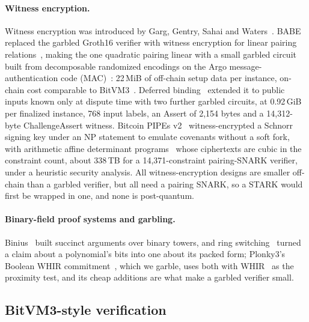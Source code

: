 \documentclass[11pt]{article}
\begin{document}
\paragraph{Witness encryption.} Witness encryption was introduced by Garg,
Gentry, Sahai and Waters~\cite{ggsw13}. BABE~\cite{babe2026} replaced the garbled
Groth16 verifier with witness encryption for linear pairing
relations~\cite{gkpw24}, making the one quadratic pairing linear with a small
garbled circuit built from decomposable randomized encodings on the Argo
message-authentication code (MAC)~\cite{el26argo}: 22\,MiB of off-chain setup data per instance, on-chain cost
comparable to BitVM3~\cite{babe2026}. Deferred
binding~\cite{goatpbwe} extended it to public inputs known only at dispute
time with two further garbled circuits, at 0.92\,GiB per finalized instance,
768 input labels, an Assert of 2{,}154 bytes and a 14{,}312-byte
ChallengeAssert witness. Bitcoin PIPEs
v2~\cite{pipesv2} witness-encrypted a Schnorr signing key under an NP
statement to emulate covenants without a soft fork, with arithmetic affine
determinant programs~\cite{aadp2026,bij20adp} whose ciphertexts are cubic in
the constraint count, about 338\,TB for a 14{,}371-constraint pairing-SNARK
verifier, under a heuristic security analysis. All witness-encryption designs
are smaller off-chain than a garbled verifier, but all need a pairing SNARK,
so a STARK would first be wrapped in one, and none is post-quantum.

\paragraph{Binary-field proof systems and garbling.} Binius~\cite{dp25binius}
built succinct arguments over binary towers, and ring
switching~\cite{dp24ringswitch} turned a claim about a polynomial's bits into
one about its packed form; Plonky3's Boolean WHIR commitment~\cite{plonky3}, which we garble,
uses both with WHIR~\cite{whir25} as the proximity test, and its cheap
additions are what make a garbled verifier small.

\subsection{BitVM3-style verification}\label{sec:bitvm3}
\end{document}
